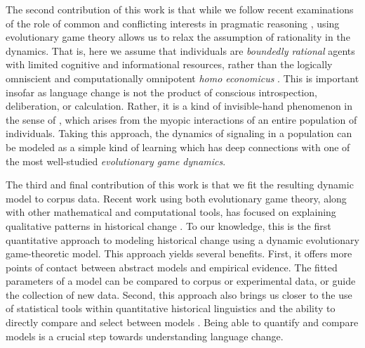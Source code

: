 \documentclass[linguex]{sp}
\theoremstyle{definition} \newtheorem{definition}{Definition}
\begin{document}
The second contribution of this work is that while we follow recent examinations of the role of common and conflicting interests in pragmatic reasoning \citep{benz-jager-van-rooij:2006, franke-etal:2012, de-jaegher-van-rooij:2013}, using evolutionary game theory allows us to relax the assumption of rationality in the dynamics. That is, here we assume that individuals are \emph{boundedly rational} agents with limited cognitive and informational resources, rather than the logically omniscient and  computationally omnipotent \emph{homo economicus} \citep{simon1955}. This is important insofar as language change is not the product of conscious introspection, deliberation, or calculation. Rather, it is a kind of invisible-hand phenomenon in the sense of \cite{Keller:1994}, which arises from the myopic interactions of an entire population of individuals.  Taking this approach, the dynamics of signaling in a population can be modeled as a simple kind of learning which has deep connections with one of the most well-studied \emph{evolutionary game dynamics}.

The third and final contribution of this work is that we fit the resulting dynamic model to corpus data. Recent work using both evolutionary game theory, along with other mathematical and computational tools, has focused on explaining qualitative patterns in historical change \citep{schaden2012, deo2015, yanovich2015, yanovich2016, enke2016}. To our knowledge, this is the first quantitative approach to modeling historical change using a dynamic evolutionary game-theoretic model. This approach yields several benefits. First, it offers more points of contact between abstract models and empirical evidence. The fitted parameters of a model can be compared to corpus or experimental data, or guide the collection of new data. Second, this approach also brings us closer to the use of statistical tools within quantitative historical linguistics \citep{kroch1989,altmann-etal1983} and the ability to directly compare and select between models \citep{burnham2003}. Being able to quantify and compare models is a crucial step towards understanding language change.
\end{document}
